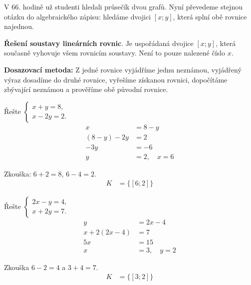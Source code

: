 \documentclass[11pt,a4paper]{article}
\begin{document}
V 66. hodině už studenti hledali průsečík dvou grafů. Nyní převedeme stejnou otázku do algebraického zápisu: hledáme dvojici $[x;y]$, která splní obě rovnice najednou.
\begin{definiceBox}[title={Definice - Řešení soustavy lineárních rovnic}]
\textbf{Řešení soustavy lineárních rovnic}. Je uspořádaná dvojice $[x;y]$, která současně vyhovuje všem rovnicím soustavy. Není to pouze nalezené číslo $x$.
\end{definiceBox}
\textbf{Dosazovací metoda:} Z jedné rovnice vyjádříme jednu neznámou, vyjádřený výraz dosadíme do druhé rovnice, vyřešíme získanou rovnici, dopočítáme zbývající neznámou a prověříme obě původní rovnice.
\begin{prikladReseniBox}[title={Příklad 1}]
Řešte $\begin{cases}x+y=8,\\x-2y=2.\end{cases}$
\tcblower
\[
\begin{aligned}
x&=8-y \\
 (8-y)-2y&=2 \\
 -3y&=-6 \\
 y&=2,\quad x=6
\end{aligned}
\]

Zkouška: $6+2=8$, $6-4=2$.
\[
\begin{aligned}
K &= \{[6;2]\}
\end{aligned}
\]
\end{prikladReseniBox}
\begin{prikladReseniBox}[title={Příklad 2}]
Řešte $\begin{cases}2x-y=4,\\x+2y=7.\end{cases}$
\tcblower
\[
\begin{aligned}
y&=2x-4 \\
 x+2(2x-4)&=7 \\
 5x&=15 \\
 x&=3,\quad y=2
\end{aligned}
\]

Zkouška $6-2=4$ a $3+4=7$.
\[
\begin{aligned}
K &= \{[3;2]\}
\end{aligned}
\]
\end{prikladReseniBox}
\end{document}
